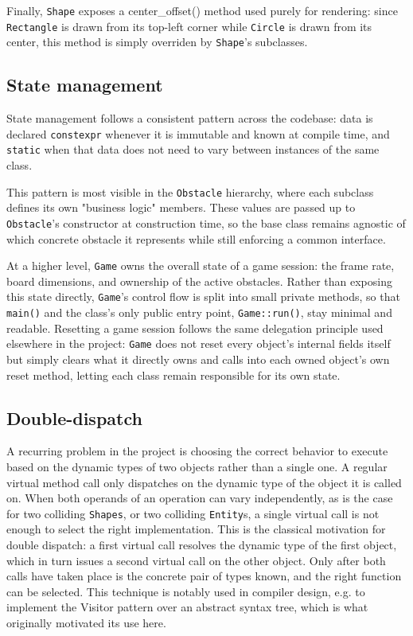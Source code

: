 \documentclass{article}
\begin{document}
Finally, \texttt{Shape} exposes a center\_offset() method used purely for rendering: since \texttt{Rectangle} is drawn from its top-left corner while \texttt{Circle} is drawn from its center, this method is simply overriden by \texttt{Shape}'s subclasses.

\subsection{State management} \label{sec: state_management}
State management follows a consistent pattern across the codebase: data is declared \texttt{constexpr} whenever it is immutable and known at compile time, and \texttt{static} when that data does not need to vary between instances of the same class.

This pattern is most visible in the \texttt{Obstacle} hierarchy, where each subclass defines its own "business logic" members. These values are passed up to \texttt{Obstacle}'s constructor at construction time, so the base class remains agnostic of which concrete obstacle it represents while still enforcing a common interface.

At a higher level, \texttt{Game} owns the overall state of a game session: the frame rate, board dimensions, and ownership of the active obstacles. Rather than exposing this state directly, \texttt{Game}'s control flow is split into small private methods, so that \texttt{main()} and the class's only public entry point, \texttt{Game::run()}, stay minimal and readable. Resetting a game session follows the same delegation principle used elsewhere in the project: \texttt{Game} does not reset every object's internal fields itself but simply clears what it directly owns and calls into each owned object's own reset method, letting each class remain responsible for its own state.

\subsection{Double-dispatch} \label{sec: double_dispatch}

A recurring problem in the project is choosing the correct behavior to execute based on the dynamic types of two objects rather than a single one. A regular virtual method call only dispatches on the dynamic type of the object it is called on. When both operands of an operation can vary independently, as is the case for two colliding \texttt{Shapes}, or two colliding \texttt{Entity}s, a single virtual call is not enough to select the right implementation. This is the classical motivation for double dispatch: a first virtual call resolves the dynamic type of the first object, which in turn issues a second virtual call on the other object. Only after both calls have taken place is the concrete pair of types known, and the right function can be selected. This technique is notably used in compiler design, e.g. to implement the Visitor pattern over an abstract syntax tree, which is what originally motivated its use here.
\end{document}
